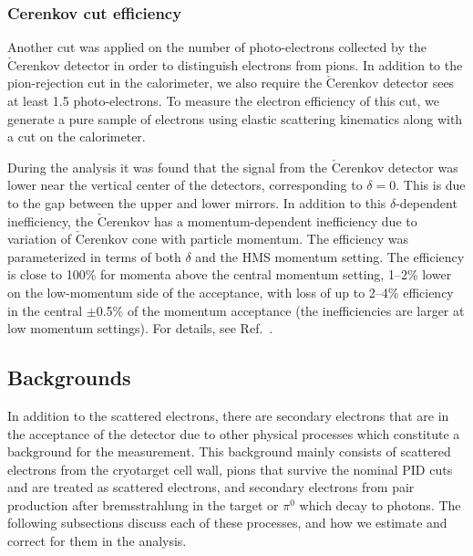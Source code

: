 \subsubsection{Cerenkov cut efficiency}\label{cercut.sssec}

Another cut was applied on the number of photo-electrons collected by the
$\mathrm{\check{C}erenkov}$ detector in order to distinguish electrons from
pions. In addition to the pion-rejection cut in the calorimeter, we also
require the $\mathrm{\check{C}erenkov}$ detector sees at least 1.5
photo-electrons.  To measure the electron efficiency of this cut, we
generate a pure sample of electrons using elastic scattering kinematics
along with a cut on the calorimeter.

During the analysis it was found that the signal from the
$\mathrm{\check{C}erenkov}$ detector was lower near the vertical center of the
detectors, corresponding to $\delta =0$.  This is due to the gap between the
upper and lower mirrors. In addition to this $\delta$-dependent inefficiency,
the $\mathrm{\check{C}erenkov}$ has a momentum-dependent inefficiency due to
variation of $\mathrm{\check{C}erenkov}$ cone with particle momentum. The
efficiency was parameterized in terms of both $\delta$ and the HMS momentum
setting. The efficiency is close to 100\% for momenta above the central
momentum setting, 1--2\% lower on the low-momentum side of the acceptance,
with loss of up to 2--4\% efficiency in the central $\pm$0.5\% of the momentum
acceptance (the inefficiencies are larger at low momentum settings).  For
details, see Ref.~\cite{aji_thesis}.


\subsection{Backgrounds}\label{bg.ssec}

In addition to the scattered electrons, there are secondary electrons that are
in the acceptance of the detector due to other physical processes which
constitute a background for the measurement. This background mainly consists
of scattered electrons from the cryotarget cell wall, pions that survive the
nominal PID cuts and are treated as scattered electrons, and secondary
electrons from pair production after bremsstrahlung in the target or $\pi^0$
which decay to photons. The following subsections discuss each of these
processes, and how we estimate and correct for them in the analysis.
 
